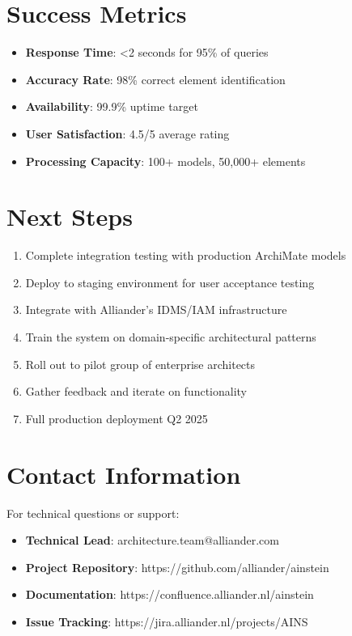 \documentclass[12pt,a4paper]{report}
\begin{document}
\section{Success Metrics}

\begin{itemize}
    \item \textbf{Response Time}: <2 seconds for 95\% of queries
    \item \textbf{Accuracy Rate}: 98\% correct element identification
    \item \textbf{Availability}: 99.9\% uptime target
    \item \textbf{User Satisfaction}: 4.5/5 average rating
    \item \textbf{Processing Capacity}: 100+ models, 50,000+ elements
\end{itemize}

\section{Next Steps}

\begin{enumerate}
    \item Complete integration testing with production ArchiMate models
    \item Deploy to staging environment for user acceptance testing
    \item Integrate with Alliander's IDMS/IAM infrastructure
    \item Train the system on domain-specific architectural patterns
    \item Roll out to pilot group of enterprise architects
    \item Gather feedback and iterate on functionality
    \item Full production deployment Q2 2025
\end{enumerate}

\section{Contact Information}

For technical questions or support:
\begin{itemize}
    \item \textbf{Technical Lead}: architecture.team@alliander.com
    \item \textbf{Project Repository}: https://github.com/alliander/ainstein
    \item \textbf{Documentation}: https://confluence.alliander.nl/ainstein
    \item \textbf{Issue Tracking}: https://jira.alliander.nl/projects/AINS
\end{itemize}
\end{document}
